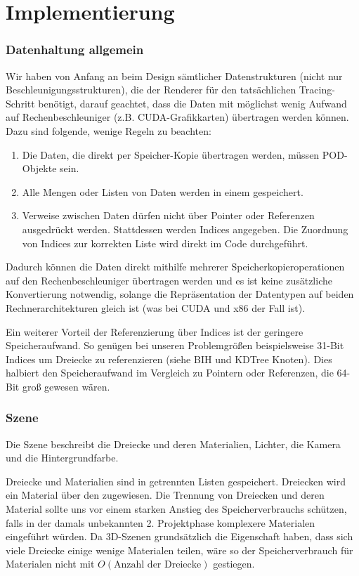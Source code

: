 \part{Implementierung}

\section{Datenhaltung allgemein}

Wir haben von Anfang an beim Design sämtlicher Datenstrukturen (nicht nur Beschleunigungsstrukturen), die der Renderer für den tatsächlichen Tracing-Schritt benötigt, darauf geachtet, dass die Daten mit möglichst wenig Aufwand auf Rechenbeschleuniger (z.B. CUDA-Grafikkarten) übertragen werden können. Dazu sind folgende, wenige Regeln zu beachten:

\begin{enumerate}
\item Die Daten, die direkt per Speicher-Kopie übertragen werden, müssen POD-Objekte sein.
\item Alle Mengen oder Listen von Daten werden in einem  gespeichert.
\item Verweise zwischen Daten dürfen nicht über Pointer oder Referenzen ausgedrückt werden. Stattdessen werden Indices angegeben. Die Zuordnung von Indices zur korrekten Liste wird direkt im Code durchgeführt.
\end{enumerate}

Dadurch können die Daten direkt mithilfe mehrerer Speicherkopieroperationen auf den Rechenbeschleuniger übertragen werden und es ist keine zusätzliche Konvertierung notwendig, solange die Repräsentation der Datentypen auf beiden Rechnerarchitekturen gleich ist (was bei CUDA und x86 der Fall ist).

Ein weiterer Vorteil der Referenzierung über Indices ist der geringere Speicheraufwand. So genügen bei unseren Problemgrößen beispielsweise 31-Bit Indices um Dreiecke zu referenzieren (siehe BIH und KDTree Knoten). Dies halbiert den Speicheraufwand im Vergleich zu Pointern oder Referenzen, die 64-Bit groß gewesen wären.

\section{Szene}

Die Szene beschreibt die Dreiecke und deren Materialien, Lichter, die Kamera und die Hintergrundfarbe.

Dreiecke und Materialien sind in getrennten Listen gespeichert. Dreiecken wird ein Material über den  zugewiesen. Die Trennung von Dreiecken und deren Material sollte uns vor einem starken Anstieg des Speicherverbrauchs schützen, falls in der damals unbekannten 2. Projektphase komplexere Materialen eingeführt würden. Da 3D-Szenen grundsätzlich die Eigenschaft haben, dass sich viele Dreiecke einige wenige Materialen teilen, wäre so der Speicherverbrauch für Materialen nicht mit $O(\text{Anzahl der Dreiecke})$ gestiegen.


